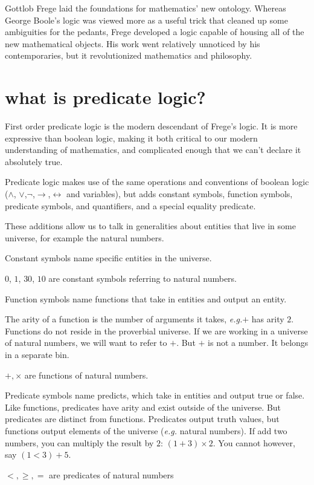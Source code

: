\documentclass{scrbook}
\renewcommand{\implies}{\to}
\renewcommand{\iff}{\leftrightarrow}
\newcommand{\eg}{\emph{e.g.}\xspace}
\begin{document}
Gottlob Frege laid the foundations for mathematics' new ontology. Whereas George Boole's logic was viewed more as a useful trick that cleaned up some ambiguities for the pedants, Frege developed a logic capable of housing all of the new mathematical objects. His work went relatively unnoticed by his contemporaries, but it revolutionized mathematics and philosophy. 

\section[What is Predicate Logic?]{what is predicate logic?}
First order predicate logic is the modern descendant of Frege's logic. It is more expressive than boolean logic, making it both critical to our modern understanding of mathematics, and complicated enough that we can't declare it absolutely true. 

Predicate logic makes use of the same operations and conventions of boolean logic ($\wedge$, $\vee$,$\neg$,$\implies$,$\iff$ and variables), but adds constant symbols, function symbols,  predicate symbols, and quantifiers, and a special equality predicate. 

These additions allow us to talk in generalities about entities that live in some universe, for example the natural numbers. 

\begin{defn}
  Constant symbols name specific entities in the universe.
\begin{example}
  $0$, $1$, $30$, $10$ are constant symbols referring to natural numbers. 
\end{example}
\end{defn}

\begin{defn}
  Function symbols name functions that take in entities and output an
  entity.

  The arity of a function is the number of arguments it takes, \eg $+$ has arity $2$.
Functions do not reside in the proverbial universe. If we are working in a universe of natural numbers, we will want to refer to $+$. But $+$ is not a number. It belongs in a separate bin.
\end{defn}
\begin{example}
  $+,\times$ are functions of natural numbers. 
\end{example}
\begin{defn}
  Predicate symbols name predicts, which take in entities and output true or false.
Like functions, predicates have arity and exist outside of the universe. But predicates are distinct from functions. Predicates output truth values, but functions output elements of the universe (\eg natural numbers). If add two numbers, you can multiply the result by $2$: $(1+3)\times 2$. You cannot however, say $(1<3)+5$. 
\end{defn}
\begin{example}
  $<,\geq,=$ are predicates of natural numbers
\end{example}
\end{document}

